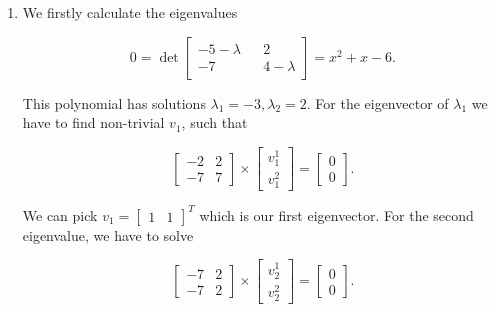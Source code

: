 \begin{exercise}[Warmup]
\begin{enumerate}
            Thus, we get the covariance matrix

            \[\begin{bmatrix}
                1 & 0 \\
                0 & 1
            \end{bmatrix}.\]

            \item[c)]
            We firstly calculate the eigenvalues

            \[0 = \det
            \begin{bmatrix}
                -5 - \lambda && 2 \\
                -7 && 4 - \lambda
            \end{bmatrix}
            = x^2 + x - 6.\]

            This polynomial has solutions \(\lambda_1 = -3, \lambda_2 = 2\).
            For the eigenvector of \(\lambda_1\) we have to find non-trivial \(v_1\), such that
            
            \[
            \begin{bmatrix}
                -2 & 2 \\
                -7 & 7
            \end{bmatrix}
            \times
            \begin{bmatrix}
                v_1^1 \\
                v_1^2
            \end{bmatrix}
            =
            \begin{bmatrix}
            0 \\
            0
            \end{bmatrix}.
            \]

            We can pick \(v_1 = \begin{bmatrix} 1 & 1 \end{bmatrix}^T\) which is our first eigenvector.
            For the second eigenvalue, we have to solve 

            \[
            \begin{bmatrix}
                -7 & 2 \\
                -7 & 2
            \end{bmatrix}
            \times
            \begin{bmatrix}
                v_2^1 \\
                v_2^2
            \end{bmatrix}
            =
            \begin{bmatrix}
            0 \\
            0
            \end{bmatrix}.
            \]


\end{enumerate}
\end{exercise}
